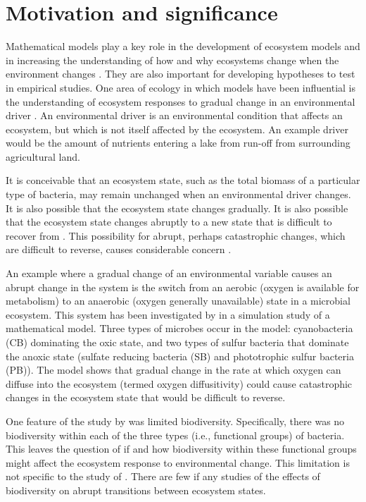 \documentclass[]{elsarticle} %
\begin{document}
\section{Motivation and significance}\label{motivation-and-significance}

Mathematical models play a key role in the development of ecosystem models and in increasing the understanding of how and why ecosystems change when the environment changes \citep{Binzer2016a, Chaparro-Pedraza2021, Vasseur2005}. They are also important for developing hypotheses to test in empirical studies. One area of ecology in which models have been influential is the understanding of ecosystem responses to gradual change in an environmental driver \citep{Scheffer2001}. An environmental driver is an environmental condition that affects an ecosystem, but which is not itself affected by the ecosystem. An example driver would be the amount of nutrients entering a lake from run-off from surrounding agricultural land.

It is conceivable that an ecosystem state, such as the total biomass of a particular type of bacteria, may remain unchanged when an environmental driver changes. It is also possible that the ecosystem state changes gradually. It is also possible that the ecosystem state changes abruptly to a new state that is difficult to recover from \citep{Scheffer2001}. This possibility for abrupt, perhaps catastrophic changes, which are difficult to reverse, causes considerable concern \citep{Collins2021, Northrop2021, Vandermeer2019}.

An example where a gradual change of an environmental variable causes an abrupt change in the system is the switch from an aerobic (oxygen is available for metabolism) to an anaerobic (oxygen generally unavailable) state in a microbial ecosystem. This system has been investigated by \citet{Bush2017} in a simulation study of a mathematical model. Three types of microbes occur in the model: cyanobacteria (CB) dominating the oxic state, and two types of sulfur bacteria that dominate the anoxic state (sulfate reducing bacteria (SB) and phototrophic sulfur bacteria (PB)). The model shows that gradual change in the rate at which oxygen can diffuse into the ecosystem (termed oxygen diffusitivity) could cause catastrophic changes in the ecosystem state that would be difficult to reverse.

One feature of the study by \citet{Bush2017} was limited biodiversity. Specifically, there was no biodiversity within each of the three types (i.e., functional groups) of bacteria. This leaves the question of if and how biodiversity within these functional groups might affect the ecosystem response to environmental change. This limitation is not specific to the study of \citet{Bush2017}. There are few if any studies of the effects of biodiversity on abrupt transitions between ecosystem states.
\end{document}
